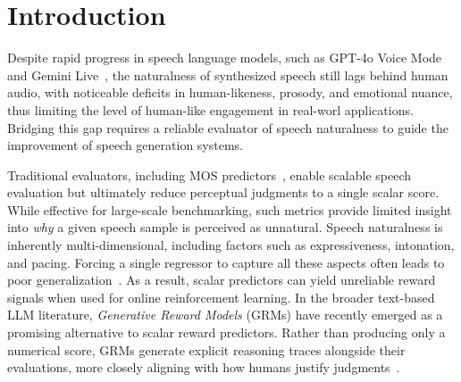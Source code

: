 \section{Introduction} \label{sec:intro}
Despite rapid progress in speech language models, such as GPT-4o Voice Mode~\cite{hurst2024gpt} and Gemini Live~\cite{comanici2025gemini}, the naturalness of synthesized speech still lags behind human audio, with noticeable deficits in human-likeness, prosody, and emotional nuance, thus limiting the level of human-like engagement in real-worl applications. Bridging this gap requires a reliable evaluator of speech naturalness to guide the improvement of speech generation systems.

Traditional evaluators, including MOS predictors~\citep{lo2019mosnet, saeki2022utmos, baba2024utmosv2, wang2024uncertainty, samos2024, hoq2025fusemos}, enable scalable speech evaluation but ultimately reduce perceptual judgments to a single scalar score. While effective for large-scale benchmarking, such metrics provide limited insight into \emph{why} a given speech sample is perceived as unnatural. Speech naturalness is inherently multi-dimensional, including factors such as expressiveness, intonation, and pacing. Forcing a single regressor to capture all these aspects often leads to poor generalization~\citep{lo2019mosnet, saeki2022utmos}. As a result, scalar predictors can yield unreliable reward signals when used for online reinforcement learning. In the broader text-based LLM literature, \emph{Generative Reward Models} (GRMs) have recently emerged as a promising alternative to scalar reward predictors. Rather than producing only a numerical score, GRMs generate explicit reasoning traces alongside their evaluations, more closely aligning with how humans justify judgments~\citep{mahan2024generative, liu2025inference, zhang2024generativeverifiers, liang2025grmcriteria}.



